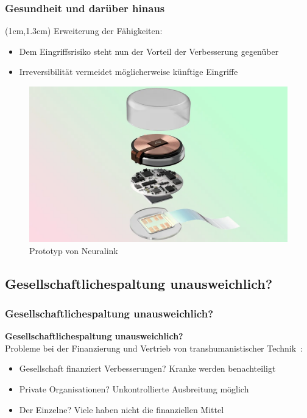 \documentclass[aspectratio=169,16pt,xcolor=table]{beamer}
\begin{document}
\begin{frame}
  \frametitle{Gesundheit und darüber hinaus}
  \begin{textblock*}{15cm}(1cm,1.3cm)
    Erweiterung der Fähigkeiten:
    \begin{itemize}
        \item Dem Eingriffsrisiko steht nun der Vorteil der Verbesserung gegenüber
        \item Irreversibilität vermeidet möglicherweise künftige Eingriffe
    \end{itemize}
  \end{textblock*}
  \begin{figure}[h]
    \includegraphics[scale=0.3]{"pictures/neuralink"}
    \caption{Prototyp von Neuralink~\cite{neuralink}}
    \label{Neuralink}
\end{figure}
\end{frame}

\subsection*{Gesellschaftlichespaltung unausweichlich?}
\begin{frame}
  \frametitle{Gesellschaftlichespaltung unausweichlich?}
  \small \textbf{Gesellschaftlichespaltung unausweichlich?}\\
  \small Probleme bei der Finanzierung und Vertrieb von transhumanistischer Technik~\cite{khan_aziz_2019}:
  \begin{itemize}
    \item Gesellschaft finanziert Verbesserungen? Kranke werden benachteiligt
    \item Private Organisationen? Unkontrollierte Ausbreitung möglich
    \item Der Einzelne? Viele haben nicht die finanziellen Mittel
  \end{itemize}
  \end{frame}
\end{document}
